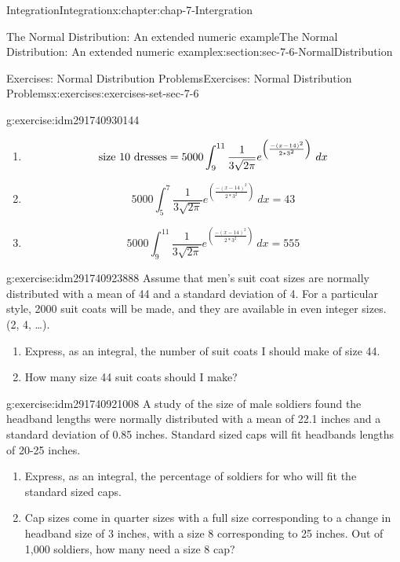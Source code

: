 \documentclass[oneside,10pt,]{book}
\numberwithin{equation}{section}
\begin{document}
\begin{chapterptx}{Integration}{}{Integration}{}{}{x:chapter:chap-7-Intergration}
\begin{sectionptx}{The Normal Distribution: An extended numeric example}{}{The Normal Distribution: An extended numeric example}{}{}{x:section:sec-7-6-NormalDistribution}
\begin{exercises-subsection}{Exercises: Normal Distribution Problems}{}{Exercises: Normal Distribution Problems}{}{}{x:exercises:exercises-set-sec-7-6}
\begin{divisionexercise}{3}{}{}{g:exercise:idm291740930144}
\begin{enumerate}[label=(\alph*)]
\item{}%
\begin{equation*}
\hbox{size 10 dresses}=5000\int_{9}^{11}
\frac{1}{3\sqrt{2\pi}}e^{\left({\frac{-(x-14)^2}{2*3^2}}\right)}\ dx
\end{equation*}
%
\item{}%
\begin{equation*}
5000\int_{5}^{7}\frac{1}{3\sqrt{2\pi}} e^{\left({\frac{-(x-14)^2}{2*3^2}}\right)}\ dx = 43
\end{equation*}
%
\item{}%
\begin{equation*}
5000\int_{9}^{11}\frac{1}{3\sqrt{2\pi}} e^{\left({\frac{-(x-14)^2}{2*3^2}}\right)}\ dx = 555
\end{equation*}
%
\end{enumerate}
\end{divisionexercise}%
\begin{divisionexercise}{4}{}{}{g:exercise:idm291740923888}%
Assume that men’s suit coat sizes are normally distributed with a mean of 44 and a standard deviation of 4.  For a particular style, 2000 suit coats will be made, and they are available in even integer sizes.  (2, 4, …).%
%
\begin{enumerate}[label=(\alph*)]
\item{}Express, as an integral, the number of suit coats I should make of size 44.%
\item{}How many size 44 suit coats should I make?%
\end{enumerate}
\end{divisionexercise}%
\begin{divisionexercise}{5}{}{}{g:exercise:idm291740921008}%
A study of the size of male soldiers found the headband lengths were normally distributed with a mean of 22.1 inches and a standard deviation of 0.85 inches.  Standard sized caps will fit headbands lengths of 20-25 inches.%
%
\begin{enumerate}[label=(\alph*)]
\item{}Express, as an integral, the percentage of soldiers for who will fit the standard sized caps.%
\item{}Cap sizes come in quarter sizes with a full size corresponding to a change in headband size of 3 inches, with a size 8 corresponding to 25 inches.  Out of 1,000 soldiers, how many need a size 8 cap?%
\end{enumerate}
\par\smallskip%

\end{divisionexercise}
\end{exercises-subsection}
\end{sectionptx}
\end{chapterptx}
\end{document}
